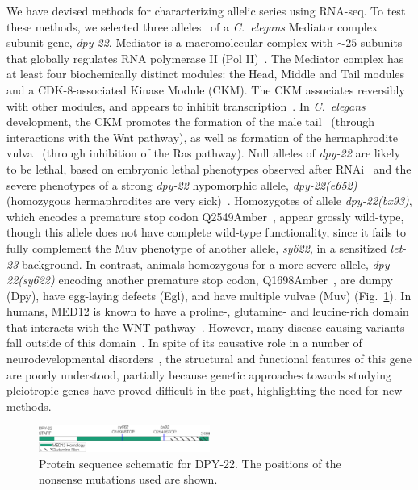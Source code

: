 \documentclass[9pt,twocolumn,twoside]{gsajnl}
\newcommand{\cel}{\emph{C.~elegans}}
\newcommand{\gene}[1]{\mbox{\emph{#1}}}
\newcommand{\protein}[1]{\mbox{\uppercase{#1}}}
\newcommand{\dpy}[1]{\gene{dpy-22#1}}
\begin{document}
We have devised methods for characterizing allelic series using RNA-seq. To test
these methods, we selected three alleles~\citep{Zhang2000,Moghal2003} of a
\cel{} Mediator complex subunit gene, \dpy{}. Mediator is a macromolecular
complex with $\sim25$ subunits~\citep{Jeronimo2017} that globally regulates RNA
polymerase II (Pol II)~\citep{Allen2015,Takagi2006}. The Mediator complex has at
least four biochemically distinct modules: the Head, Middle and Tail modules and
a CDK-8-associated Kinase Module (CKM). The CKM associates reversibly with other
modules, and appears to inhibit transcription~\citep{Knuesel2009,Elmlund2006}.
In \cel{} development, the CKM promotes the formation of the male
tail~\citep{Zhang2000} (through interactions with the Wnt pathway), as well as
formation of the hermaphrodite vulva~\citep{Moghal2003} (through inhibition of
the Ras pathway). Null alleles of \dpy{} are likely to be lethal, based on
embryonic lethal phenotypes observed after RNAi~\citep{Wang2004,Lehner2006} and
the severe phenotypes of a strong \dpy{} hypomorphic allele, \gene{dpy-22(e652)}
(homozygous hermaphrodites are very sick)~\citep{Riddle1997}. Homozygotes of
allele \gene{dpy-22(bx93)}, which encodes a premature stop codon
Q2549Amber~\citep{Zhang2000}, appear grossly wild-type, though this allele does
not have complete wild-type functionality, since it fails to fully complement
the Muv phenotype of another allele, \emph{sy622}, in a sensitized \emph{let-23}
background. In contrast, animals homozygous for a more severe allele,
\gene{dpy-22(sy622)} encoding another premature stop codon,
Q1698Amber~\citep{Moghal2003}, are dumpy (Dpy), have egg-laying defects (Egl),
and have multiple vulvae (Muv) (Fig.~\ref{fig:genemodel}). In
humans, \protein{MED12} is known to have a proline-, glutamine- and leucine-rich
domain that interacts with the WNT pathway~\citep{Kim2006}. However, many
disease-causing variants fall outside of this domain~\citep{Yamamoto2015}.
In spite of its causative role in a number of neurodevelopmental
disorders~\citep{Graham2013}, the structural and functional features of this
gene are poorly understood, partially because genetic approaches towards
studying pleiotropic genes have proved difficult in the past, highlighting the
need for new methods.

\begin{figure}
  \centering{}
  \includegraphics[width=0.5\textwidth]{../figs/Gene_Model.pdf}
  \caption{
           Protein sequence schematic for \protein{dpy-22}. The positions of the
           nonsense mutations used are shown.
           }
\label{fig:genemodel}
\end{figure}
\end{document}
